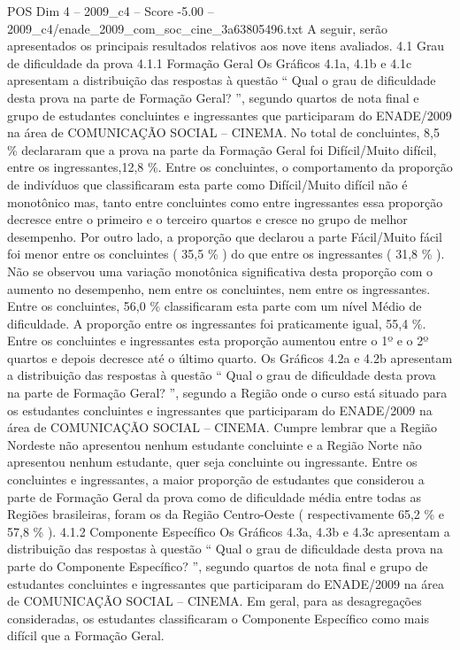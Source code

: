 \begin{textsample}{POS Dim 4 – 2009\_c4 – Score -5.00 – 2009\_c4/enade\_2009\_com\_soc\_cine\_3a63805496.txt}
A seguir, serão apresentados os principais resultados relativos aos nove itens avaliados. 4.1 Grau de dificuldade da prova 4.1.1 Formação Geral Os Gráficos 4.1a, 4.1b e 4.1c apresentam a distribuição das respostas à questão “ Qual o grau de dificuldade desta prova na parte de Formação Geral? ”, segundo quartos de nota final e grupo de estudantes concluintes e ingressantes que participaram do ENADE/2009 na área de COMUNICAÇÃO SOCIAL – CINEMA.
No total de concluintes, 8,5 \% declararam que a prova na parte da Formação Geral foi Difícil/Muito difícil, entre os ingressantes,12,8 \%.
Entre os concluintes, o comportamento da proporção de indivíduos que classificaram esta parte como Difícil/Muito difícil não é monotônico mas, tanto entre concluintes como entre ingressantes essa proporção decresce entre o primeiro e o terceiro quartos e cresce no grupo de melhor desempenho.
Por outro lado, a proporção que declarou a parte Fácil/Muito fácil foi menor entre os concluintes ( 35,5 \% ) do que entre os ingressantes ( 31,8 \% ).
Não se observou uma variação monotônica significativa desta proporção com o aumento no desempenho, nem entre os concluintes, nem entre os ingressantes.
Entre os concluintes, 56,0 \% classificaram esta parte com um nível Médio de dificuldade.
A proporção entre os ingressantes foi praticamente igual, 55,4 \%.
Entre os concluintes e ingressantes esta proporção aumentou entre o 1º e o 2º quartos e depois decresce até o último quarto.
Os Gráficos 4.2a e 4.2b apresentam a distribuição das respostas à questão “ Qual o grau de dificuldade desta prova na parte de Formação Geral? ”, segundo a Região onde o curso está situado para os estudantes concluintes e ingressantes que participaram do ENADE/2009 na área de COMUNICAÇÃO SOCIAL – CINEMA.
Cumpre lembrar que a Região Nordeste não apresentou nenhum estudante concluinte e a Região Norte não apresentou nenhum estudante, quer seja concluinte ou ingressante.
Entre os concluintes e ingressantes, a maior proporção de estudantes que considerou a parte de Formação Geral da prova como de dificuldade média entre todas as Regiões brasileiras, foram os da Região Centro-Oeste ( respectivamente 65,2 \% e 57,8 \% ). 4.1.2 Componente Específico Os Gráficos 4.3a, 4.3b e 4.3c apresentam a distribuição das respostas à questão “ Qual o grau de dificuldade desta prova na parte do Componente Específico? ”, segundo quartos de nota final e grupo de estudantes concluintes e ingressantes que participaram do ENADE/2009 na área de COMUNICAÇÃO SOCIAL – CINEMA.
Em geral, para as desagregações consideradas, os estudantes classificaram o Componente Específico como mais difícil que a Formação Geral.

\end{textsample}
